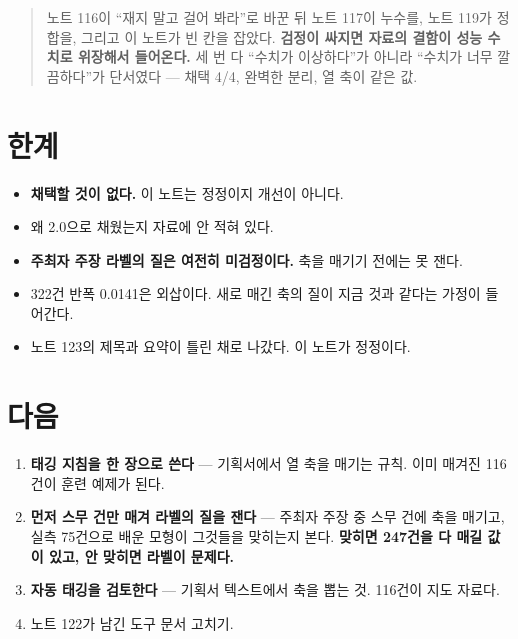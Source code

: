 \documentclass[10pt]{article}
\begin{document}

\begin{quote}\fontsize{9.5}{11.5}\selectfont
노트 116이 ``재지 말고 걸어 봐라''로 바꾼 뒤 노트 117이 누수를, 노트 119가
정합을, 그리고 이 노트가 빈 칸을 잡았다. \textbf{검정이 싸지면 자료의 결함이
성능 수치로 위장해서 들어온다.} 세 번 다 ``수치가 이상하다''가 아니라
``수치가 너무 깔끔하다''가 단서였다 --- 채택 4/4, 완벽한 분리, 열 축이 같은 값.
\end{quote}

\section{한계}

\begin{itemize}[leftmargin=1.1em,itemsep=0.15em]
\item \textbf{채택할 것이 없다.} 이 노트는 정정이지 개선이 아니다.
\item 왜 2.0으로 채웠는지 자료에 안 적혀 있다.
\item \textbf{주최자 주장 라벨의 질은 여전히 미검정이다.} 축을 매기기 전에는
      못 잰다.
\item 322건 반폭 0.0141은 외삽이다. 새로 매긴 축의 질이 지금 것과 같다는
      가정이 들어간다.
\item 노트 123의 제목과 요약이 틀린 채로 나갔다. 이 노트가 정정이다.
\end{itemize}

\section{다음}

\begin{enumerate}[leftmargin=1.3em,itemsep=0.15em]
\item \textbf{태깅 지침을 한 장으로 쓴다} --- 기획서에서 열 축을 매기는 규칙.
      이미 매겨진 116건이 훈련 예제가 된다.
\item \textbf{먼저 스무 건만 매겨 라벨의 질을 잰다} --- 주최자 주장 중 스무
      건에 축을 매기고, 실측 75건으로 배운 모형이 그것들을 맞히는지 본다.
      \textbf{맞히면 247건을 다 매길 값이 있고, 안 맞히면 라벨이 문제다.}
\item \textbf{자동 태깅을 검토한다} --- 기획서 텍스트에서 축을 뽑는 것.
      116건이 지도 자료다.
\item 노트 122가 남긴 도구 문서 고치기.
\end{enumerate}
\end{document}
